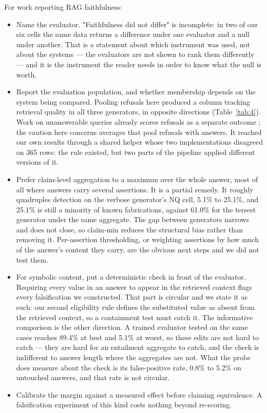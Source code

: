 \documentclass[11pt]{article}
\begin{document}
For work reporting RAG faithfulness:

\begin{itemize}
\item Name the evaluator. "Faithfulness did not differ" is incomplete: in two of our six cells the same data returns a difference under one evaluator and a null under another. That is a statement about which instrument was used, not about the systems --- the evaluators are not shown to rank them differently --- and it is the instrument the reader needs in order to know what the null is worth.
\item Report the evaluation population, and whether membership depends on the system being compared. Pooling refusals here produced a column tracking retrieval quality in all three generators, in opposite directions (Table~\ref{tab:4}). Work on unanswerable queries already scores refusals as a separate outcome \citep{peng-etal-2025-unanswerability,muhamed-etal-2026-refusalbench}; the caution here concerns averages that pool refusals with answers. It reached our own results through a shared helper whose two implementations disagreed on 365 rows: the rule existed, but two parts of the pipeline applied different versions of it.
\item Prefer claim-level aggregation to a maximum over the whole answer, most of all where answers carry several assertions. It is a partial remedy. It roughly quadruples detection on the verbose generator's NQ cell, 5.1\% to 25.1\%, and 25.1\% is still a minority of known fabrications, against 61.0\% for the tersest generator under the same aggregate. The gap between generators narrows and does not close, so claim-min reduces the structural bias rather than removing it. Per-assertion thresholding, or weighting assertions by how much of the answer's content they carry, are the obvious next steps and we did not test them.
\item For symbolic content, put a deterministic check in front of the evaluator. Requiring every value in an answer to appear in the retrieved context flags every falsification we constructed. That part is circular and we state it as such: our second eligibility rule defines the substituted value as absent from the retrieved context, so a containment test must catch it. The informative comparison is the other direction. A trained evaluator tested on the same cases reaches 89.4\% at best and 5.1\% at worst, so these edits are not hard to catch --- they are hard for an entailment aggregate to catch, and the check is indifferent to answer length where the aggregates are not. What the probe does measure about the check is its false-positive rate, 0.8\% to 5.2\% on untouched answers, and that rate is not circular.
\item Calibrate the margin against a measured effect before claiming equivalence. A falsification experiment of this kind costs nothing beyond re-scoring.
\end{itemize}
\end{document}

